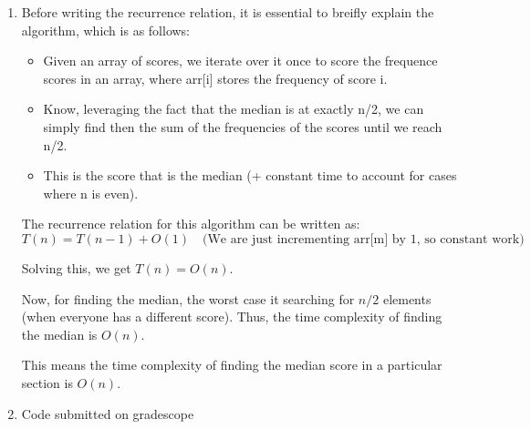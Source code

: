 \documentclass{cs1204}
\begin{document}
\begin{enumerate}[label=(\alph*)]
    \item Before writing the recurrence relation, it is essential to breifly explain the algorithm, which is as follows:
    \begin{itemize}
        \item Given an array of scores, we iterate over it once to score the frequence scores in an array, where arr[i] stores the frequency of score i.
        \item Know, leveraging the fact that the median is at exactly n/2, we can simply find then the sum of the frequencies of the scores until we reach n/2.
        \item This is the score that is the median (+ constant time to account for cases where n is even).
    \end{itemize}

    The recurrence relation for this algorithm can be written as:
    \[ T(n) = T(n - 1) + O(1) \quad \text{(We are just incrementing arr[m] by 1, so constant work)} \]

    Solving this, we get $T(n) = O(n)$.

    Now, for finding the median, the worst case it searching for $n/2$ elements (when everyone has a different score). Thus, the time complexity of finding the median is $O(n)$.

    This means the time complexity of finding the median score in a particular section is $O(n)$.

    \item Code submitted on gradescope
\end{enumerate}

\newpage
\end{document}

